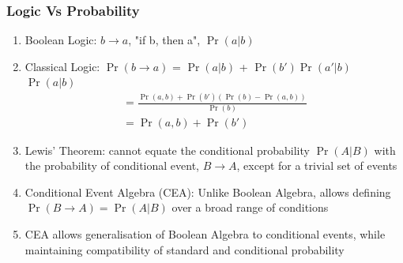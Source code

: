 \documentclass{beamer}
\providecommand{\pr}[1]{\ensuremath{\Pr\left(#1\right)}}
\begin{document}
\begin{frame}[fragile]
\frametitle{Logic Vs Probability}

\begin{flushleft}
\begin{enumerate}
    \item Boolean Logic: $b \rightarrow a $, "if b, then a", \pr{a|b}\\
    \item Classical Logic: \pr{b\rightarrow a} = \pr{a|b} + \pr{b'}\pr{a' | b} \geq \pr{a|b}\\
    \begin{align}
         = \frac{\pr{a,b}+ \pr{b'}(\pr{b} - \pr{a,b})}{\pr{b}}\\
         = \pr{a,b} + \pr{b'}
    \end{align}
        \end{enumerate}
          \end{flushleft}
    \begin{flushleft}
    \begin{enumerate}
     \setcounter{enumi}{2}
      \item {Lewis' Theorem:} cannot equate the conditional probability $\pr{A|B}$ with the probability of conditional event, $B\rightarrow A$, except for a trivial set of events\\
      \item {Conditional Event Algebra (CEA):} Unlike Boolean Algebra, allows defining $\pr{B\rightarrow A} = \pr{A|B}$ over a broad range of conditions
      \item CEA allows generalisation of Boolean Algebra to conditional events, while maintaining compatibility of standard and conditional probability
    \end{enumerate}
\end{flushleft}
\end{frame}
\end{document}
